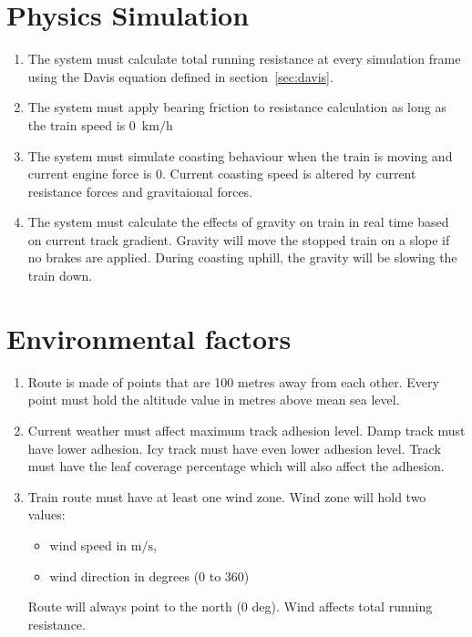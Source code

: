 \documentclass[12pt,a4paper]{report}
\DeclareRobustCommand{\reqLabel}[2]
{\hspace{16pt}\textbullet\hspace{7pt}\bfseries#1-\padzeroes[3]{\decimal{#2}}:}
\begin{document}
\section{Physics Simulation}
\begin{enumerate}[label=\reqLabel{FR-SIM}*, align=left]
    \item The system must calculate total running resistance at every simulation frame using the Davis equation defined in section~\ref{sec:davis}.
    \item The system must apply bearing friction to resistance calculation as long as the train speed is 0~$\mathrm{km/h}$
    \item The system must simulate coasting behaviour when the train is moving and current engine force is 0. Current coasting speed is altered by current resistance forces and gravitaional forces.
    \item The system must calculate the effects of gravity on train in real time based on current track gradient. Gravity will move the stopped train on a slope if no brakes are applied. During coasting uphill, the gravity will be slowing the train down.
\end{enumerate}

\section{Environmental factors}
\begin{enumerate}[label=\reqLabel{FR-ENV}*, align=left]
    \item Route is made of points that are 100 metres away from each other. Every point must hold the altitude value in metres above mean sea level.
    \item Current weather must affect maximum track adhesion level. Damp track must have lower adhesion. Icy track must have even lower adhesion level. Track must have the leaf coverage percentage which will also affect the adhesion.
    \item Train route must have at least one wind zone. Wind zone will hold two values:
    \begin{itemize}
        \item wind speed in $\mathrm{m/s}$,
        \item wind direction in degrees (0 to 360)
    \end{itemize}
    Route will always point to the north (0 deg). Wind affects total running resistance.
\end{enumerate}
\end{document}
